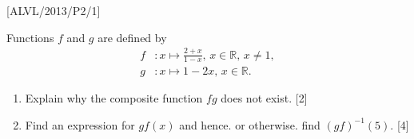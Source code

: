 \item {[}ALVL/2013/P2/1{]}

Functions $f$ and $g$ are defined by 
\begin{align*}
f & :x\mapsto\frac{2+x}{1-x},\,x\in\mathbb{R},\,x\ne1,\\
g & :x\mapsto1-2x,\,x\in\mathbb{R}.
\end{align*}

\begin{enumerate}
\item Explain why the composite function $fg$ does not exist. \hfill{}
{[}2{]}
\item Find an expression for $gf\left(x\right)$ and hence. or otherwise.
find $\left(gf\right)^{-1}\left(5\right)$. \hfill{} {[}4{]}
\end{enumerate}
